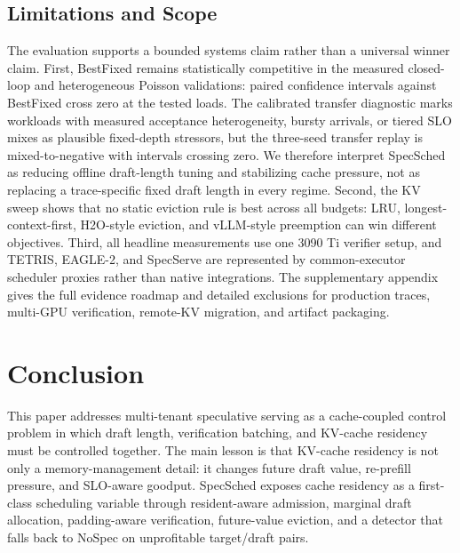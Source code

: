 \documentclass[journal]{IEEEtran}
\newcommand{\system}{SpecSched}
\begin{document}
\subsection{Limitations and Scope}
\label{sec:limitations}

The evaluation supports a bounded systems claim rather than a universal
winner claim. First, BestFixed remains statistically competitive in the
measured closed-loop and heterogeneous Poisson validations: paired
confidence intervals against BestFixed cross zero at the tested loads.
The calibrated transfer diagnostic marks workloads with measured
acceptance heterogeneity, bursty arrivals, or tiered SLO mixes as
plausible fixed-depth stressors, but the three-seed transfer replay is
mixed-to-negative with intervals crossing zero. We therefore interpret
\system{} as reducing offline draft-length tuning and stabilizing cache
pressure, not as replacing a trace-specific fixed draft length in every
regime. Second, the KV sweep shows that no
static eviction rule is best across all budgets: LRU,
longest-context-first, H2O-style eviction, and vLLM-style preemption can
win different objectives. Third, all headline measurements use one 3090
Ti verifier setup, and TETRIS, EAGLE-2, and SpecServe are represented by
common-executor scheduler proxies rather than native integrations. The
supplementary appendix gives the full evidence roadmap and detailed
exclusions for production traces, multi-GPU verification, remote-KV
migration, and artifact packaging.

\section{Conclusion}
\label{sec:conclusion}

This paper addresses multi-tenant speculative serving as a
cache-coupled control problem in which draft length, verification
batching, and KV-cache residency must be controlled together. The main
lesson is that KV-cache residency is not only a memory-management detail:
it changes future draft value, re-prefill pressure, and SLO-aware
goodput. \system{} exposes cache residency as a first-class scheduling
variable through resident-aware admission, marginal draft allocation,
padding-aware verification, future-value eviction, and a detector that
falls back to NoSpec on unprofitable target/draft pairs.
\end{document}

